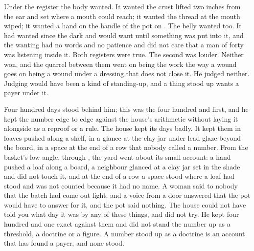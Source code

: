 Under the register the body wanted. It wanted the crust lifted two inches from the ear and set where a mouth could reach; it wanted the thread at the mouth wiped; it wanted a hand on the handle of the pot on . The belly wanted too. It had wanted since the dark and would want until something was put into it, and the wanting had no words and no patience and did not care that a man of forty was listening inside it. Both registers were true. The second was louder. Neither won, and the quarrel between them went on being the work the way a wound goes on being a wound under a dressing that does not close it. He judged neither. Judging would have been a kind of standing-up, and a thing stood up wants a payer under it.

Four hundred days stood behind him; this was the four hundred and first, and he kept the number edge to edge against the house's arithmetic without laying it alongside as a reproof or a rule. The house kept its days badly. It kept them in loaves pushed along a shelf, in a glance at the clay jar under lead glaze beyond the board, in a space at the end of a row that nobody called a number. From the basket's low angle, through , the yard went about its small account: a hand pushed a loaf along a board, a neighbour glanced at a clay jar set in the shade and did not touch it, and at the end of a row a space stood where a loaf had stood and was not counted because it had no name. A woman said to nobody that the batch had come out light, and a voice from a door answered that the pot would have to answer for it, and the pot said nothing. The house could not have told you what day it was by any of these things, and did not try. He kept four hundred and one exact against them and did not stand the number up as a threshold, a doctrine or a figure. A number stood up as a doctrine is an account that has found a payer, and none stood.

\scenebreak

